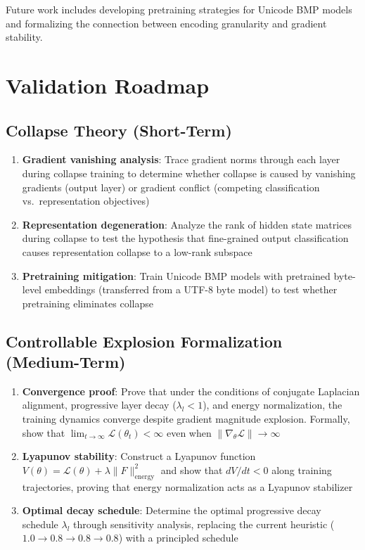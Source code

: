 \documentclass{article}
\begin{document}
Future work includes developing pretraining strategies for Unicode BMP models and formalizing the connection between encoding granularity and gradient stability.

\section{Validation Roadmap}

\subsection{Collapse Theory (Short-Term)}

\begin{enumerate}
\item \textbf{Gradient vanishing analysis}: Trace gradient norms through each layer during collapse training to determine whether collapse is caused by vanishing gradients (output layer) or gradient conflict (competing classification vs.\ representation objectives)
\item \textbf{Representation degeneration}: Analyze the rank of hidden state matrices during collapse to test the hypothesis that fine-grained output classification causes representation collapse to a low-rank subspace
\item \textbf{Pretraining mitigation}: Train Unicode BMP models with pretrained byte-level embeddings (transferred from a UTF-8 byte model) to test whether pretraining eliminates collapse
\end{enumerate}

\subsection{Controllable Explosion Formalization (Medium-Term)}

\begin{enumerate}
\item \textbf{Convergence proof}: Prove that under the conditions of conjugate Laplacian alignment, progressive layer decay ($\lambda_l < 1$), and energy normalization, the training dynamics converge despite gradient magnitude explosion. Formally, show that $\lim_{t \to \infty} \mathcal{L}(\theta_t) < \infty$ even when $\|\nabla_\theta \mathcal{L}\| \to \infty$
\item \textbf{Lyapunov stability}: Construct a Lyapunov function $V(\theta) = \mathcal{L}(\theta) + \lambda \|F\|_{\text{energy}}^2$ and show that $dV/dt < 0$ along training trajectories, proving that energy normalization acts as a Lyapunov stabilizer
\item \textbf{Optimal decay schedule}: Determine the optimal progressive decay schedule $\lambda_l$ through sensitivity analysis, replacing the current heuristic ($1.0 \rightarrow 0.8 \rightarrow 0.8 \rightarrow 0.8$) with a principled schedule
\end{enumerate}
\end{document}
